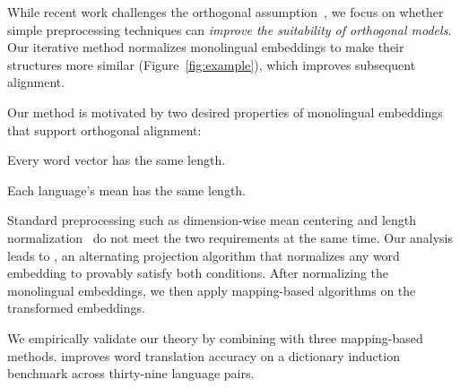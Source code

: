 While recent work challenges the orthogonal
assumption~\citep{doval-18,joulin-18,jawanpuria-19}, we focus on whether simple
preprocessing techniques can \emph{improve the suitability of orthogonal
models}.
Our iterative method normalizes monolingual embeddings to make their structures
more similar (Figure~\ref{fig:example}), which improves subsequent
alignment.

Our method is motivated by two desired properties of monolingual embeddings
that support orthogonal alignment:
\begin{enumerate*}
\item Every word vector has the same length.
\item Each language's mean has the same length.
\end{enumerate*}
Standard preprocessing such as dimension-wise mean centering and length
normalization~\cite{artetxe-16} do not meet the two requirements at
the same time.
%
Our analysis leads to \emph{\name{}}, an alternating projection
algorithm that normalizes any word embedding to provably satisfy both
conditions.
%
After normalizing the monolingual embeddings, we then apply
mapping-based  algorithms on the transformed embeddings.

We empirically validate our theory by combining \name{} with three
mapping-based  methods.
%
\name{} improves word translation accuracy on a dictionary induction benchmark
across thirty-nine language pairs.
